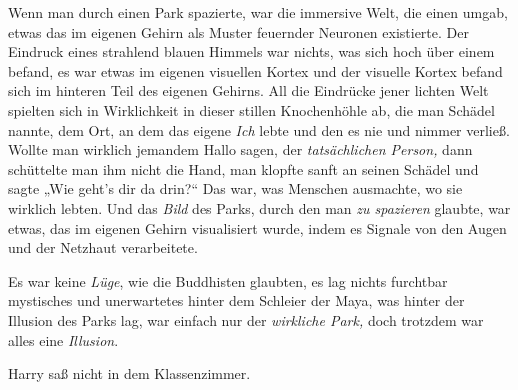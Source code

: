 Wenn man durch einen Park spazierte, war die immersive Welt, die einen umgab, etwas das im eigenen Gehirn als Muster feuernder Neuronen existierte. Der Eindruck eines strahlend blauen Himmels war nichts, was sich hoch über einem befand, es war etwas im eigenen visuellen Kortex und der visuelle Kortex befand sich im hinteren Teil des eigenen Gehirns. All die Eindrücke jener lichten Welt spielten sich in Wirklichkeit in dieser stillen Knochenhöhle ab, die man Schädel nannte, dem Ort, an dem das eigene \emph{Ich} lebte und den es nie und nimmer verließ. Wollte man wirklich jemandem Hallo sagen, der \emph{tatsächlichen Person,} dann schüttelte man ihm nicht die Hand, man klopfte sanft an seinen Schädel und sagte „Wie geht’s dir da drin?“ Das war, was Menschen ausmachte, wo sie wirklich lebten. Und das \emph{Bild} des Parks, durch den man \emph{zu spazieren} glaubte, war etwas, das im eigenen Gehirn visualisiert wurde, indem es Signale von den Augen und der Netzhaut verarbeitete.

Es war keine \emph{Lüge}, wie die Buddhisten glaubten, es lag nichts furchtbar mystisches und unerwartetes hinter dem Schleier der Maya, was hinter der Illusion des Parks lag, war einfach nur der \emph{wirkliche Park,} doch trotzdem war alles eine \emph{Illusion}.

Harry saß nicht in dem Klassenzimmer.

